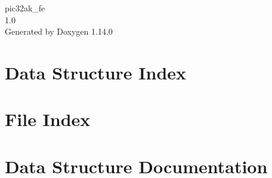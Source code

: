\documentclass[twoside]{book}
\newcommand{\+}{\discretionary{\mbox{\scriptsize$\hookleftarrow$}}{}{}}
\newcommand{\clearemptydoublepage}{%
    \newpage{\pagestyle{empty}\cleardoublepage}%
  }
\begin{document}
  \raggedbottom
    \hypersetup{pageanchor=false,
                bookmarksnumbered=true,
                pdfencoding=unicode
               }
  \begin{titlepage}
  \vspace*{7cm}
  \begin{center}%
  {\Large pic32ak\+\_\+fe}\\
  [1ex]\large 1.\+0 \\
  \vspace*{1cm}
  {\large Generated by Doxygen 1.14.0}\\
  \end{center}
  \end{titlepage}
  \clearemptydoublepage
  \tableofcontents
  \clearemptydoublepage
  \hypersetup{pageanchor=true}
\chapter{Data Structure Index}

\chapter{File Index}

\chapter{Data Structure Documentation}

























\end{document}

